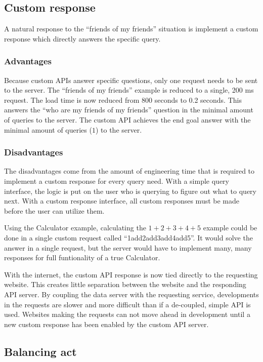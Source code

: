 \documentclass[stat,dissertation]{puthesis}\usepackage[]{graphicx}\usepackage{xcolor}
\begin{document}
\subsection{Custom response}

A natural response to the ``friends of my friends'' situation is implement a custom response which directly answers the specific query.

\subsubsection{Advantages}

Because custom APIs answer specific questions, only one request needs to be sent to the server.  The ``friends of my friends'' example is reduced to a single, 200 ms request.  The load time is now reduced from 800 seconds to 0.2 seconds.  This answers the ``who are my friends of my friends'' question in the minimal amount of queries to the server.  The custom API achieves the end goal answer with the minimal amount of queries ($1$) to the server.

\subsubsection{Disadvantages}

The disadvantages come from the amount of engineering time that is required to implement a custom response for every query need.  With a simple query interface, the logic is put on the user who is querying to figure out what to query next.  With a custom response interface, all custom responses must be made before the user can utilize them.

Using the Calculator example, calculating the $1 + 2 + 3 + 4 + 5$ example could be done in a single custom request called ``1add2add3add4add5''.  It would solve the answer in a single request, but the server would have to implement many, many responses for full funtionality of a true Calculator.

With the internet, the custom API response is now tied directly to the requesting website.  This creates little separation between the website and the responding API server.  By coupling the data server with the requesting service, developments in the requests are slower and more difficult than if a de-coupled, simple API is used.  Websites making the requests can not move ahead in development until a new custom response has been enabled by the custom API server.

\subsection{Balancing act}
\end{document}
